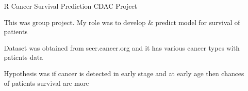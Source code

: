 \begin{cventries}
   \cventry
    {R} %
    {Cancer Survival Prediction} %
    {CDAC Project} %
    {} %
    {
      \begin{cvitems} %
        \item {This was group project. My role was  to develop \& predict model for survival of patients}
        \item {Dataset was obtained from seer.cancer.org and it has various cancer types with patients data}
        \item {Hypothesis was if cancer is detected in early stage and at early age 
               then chances of patients survival are more}
      \end{cvitems}
    }







\end{cventries}
